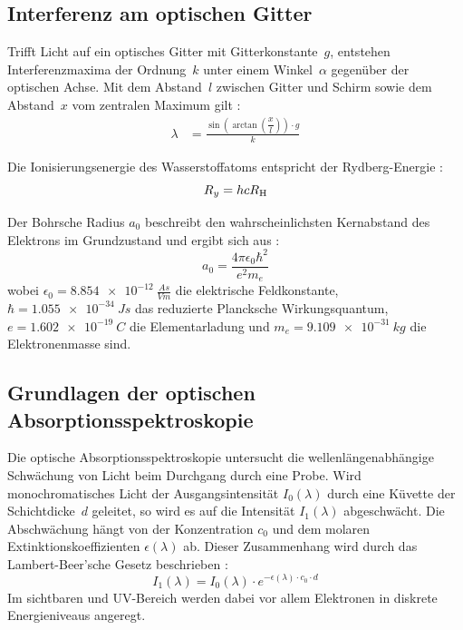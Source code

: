 \subsection{Interferenz am optischen Gitter}
Trifft Licht auf ein optisches Gitter mit Gitterkonstante~$g$, entstehen Interferenzmaxima der Ordnung~$k$ unter einem Winkel~$\alpha$ gegenüber der optischen Achse. Mit dem Abstand~$l$ zwischen Gitter und Schirm sowie dem Abstand~$x$ vom zentralen Maximum gilt \cite[307--310]{demtroder_experimentalphysik_2017}:
\begin{align}
  \lambda & = \frac{\sin\!\left(\arctan\!\left(\dfrac{x}{l}\right)\right) \cdot g}{k}
  \label{eq:optisches-gitter}
\end{align}

Die Ionisierungsenergie des Wasserstoffatoms entspricht der Rydberg-Energie \cite[101]{demtroder_experimentalphysik_2016}:
\begin{equation}
  R_y = h c R_{\ce{H}}
  \label{eq:rydberg-energie}
\end{equation}

Der Bohrsche Radius $a_0$ beschreibt den wahrscheinlichsten Kernabstand des Elektrons im Grundzustand und ergibt sich aus \cite[103]{demtroder_experimentalphysik_2016}:
\begin{equation}
  a_0 = \frac{4\pi\epsilon_0\hbar^2}{e^2 m_e}
  \label{eq:bohr-radius}
\end{equation}
wobei $\epsilon_0 = \SI{8,854e-12}{\frac{As}{Vm}}$ die elektrische Feldkonstante, $\hbar = \SI{1,055e-34}{J s}$ das reduzierte Plancksche Wirkungsquantum, $e = \SI{1,602e-19}{C}$ die Elementarladung und $m_e = \SI{9,109e-31}{kg}$ die Elektronenmasse sind.


\subsection{Grundlagen der optischen Absorptionsspektroskopie}
Die optische Absorptionsspektroskopie untersucht die wellenlängenabhängige Schwächung von Licht beim Durchgang durch eine Probe. Wird monochromatisches Licht der Ausgangsintensität $I_0(\lambda)$ durch eine Küvette der Schichtdicke~$d$ geleitet, so wird es auf die Intensität $I_1(\lambda)$ abgeschwächt. Die Abschwächung hängt von der Konzentration $c_0$ und dem molaren Extinktionskoeffizienten $\epsilon(\lambda)$ ab. Dieser Zusammenhang wird durch das Lambert-Beer'sche Gesetz beschrieben \cite[24--25]{skript}:
\begin{equation}
  I_1(\lambda) = I_0(\lambda) \cdot e^{-\epsilon(\lambda)\cdot c_0 \cdot d}
  \label{eq:lambert-beer}
\end{equation}
Im sichtbaren und UV-Bereich werden dabei vor allem Elektronen in diskrete Energieniveaus angeregt.

